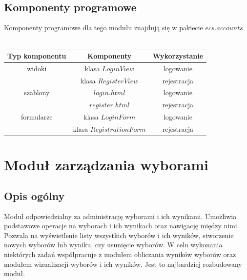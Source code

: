 \documentclass[pdflatex,11pt]{../aghdoc_version2}
\begin{document}
\subsection{Komponenty programowe}
Komponenty programowe dla tego modułu znajdują się w pakiecie $ecs.accounts$ \\ \\
{
\centering
\begin{tabular}{|c|c|c|}
\hline 
\textbf{Typ komponentu} & \textbf{Komponenty} & \textbf{Wykorzystanie} \\ 
\hline 
widoki & klasa $LoginView$ & logowanie \\ 
\cline{2-3} 
 & klasa $RegisterView$ & rejestracja \\ 
\hline 
szablony & $login.html$ & logowanie \\ 
\cline{2-3} 
 & $register.html$ & rejestracja \\ 
\hline 
formularze & klasa $LoginForm$ & logowanie \\ 
\cline{2-3} 
 & klasa $RegistrationForm$ & rejestracja \\ 
\hline 
\end{tabular} 
}

\section{Moduł zarządzania wyborami}
\subsection{Opis ogólny}
Moduł odpowiedzialny za administrację wyborami i ich wynikami. Umożliwia podstawowe
operacje na wyborach i ich wynikach oraz nawigację między nimi. Pozwala na wyświetlenie
listy wszystkich wyborów i ich wyników, stworzenie nowych wyborów lub wyniku, czy
usunięcie wyborów. W celu wykonania niektórych zadań współpracuje z modułem obliczania
wyników wyborów oraz modułem wizualizacji wyborów i ich wyników. Jest to najbardziej
rozbudowany moduł.
\end{document}
